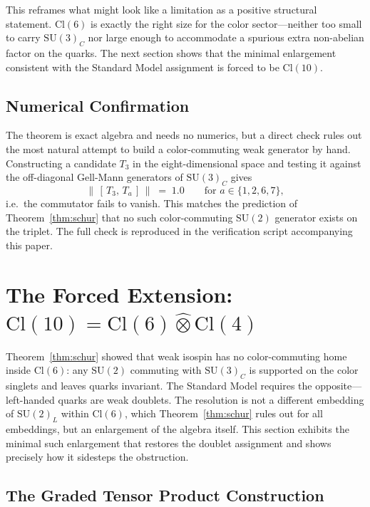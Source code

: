 \documentclass[12pt]{article}
\theoremstyle{remark}
\newcommand{\cl}{\mathrm{Cl}}
\newcommand{\su}{\mathrm{SU}}
\newcommand{\grtensor}{\mathbin{\widehat{\otimes}}}  %
\begin{document}
This reframes what might look like a limitation as a positive structural
statement.  $\cl(6)$ is exactly the right size for the color sector---neither
too small to carry $\su(3)_C$ nor large enough to accommodate a spurious extra
non-abelian factor on the quarks.  The next section shows that the minimal
enlargement consistent with the Standard Model assignment is forced to be
$\cl(10)$.

\subsection{Numerical Confirmation}
\label{sec:schur-numeric}

The theorem is exact algebra and needs no numerics, but a direct check rules out
the most natural attempt to build a color-commuting weak generator by hand.
Constructing a candidate $T_3$ in the eight-dimensional space and testing it
against the off-diagonal Gell-Mann generators of $\su(3)_C$ gives
\begin{equation}
	\bigl\|\,[\,T_3,\,T_a\,]\,\bigr\| \;=\; 1.0
	\qquad \text{for } a\in\{1,2,6,7\},
	\label{eq:commnumeric}
\end{equation}
i.e.\ the commutator fails to vanish.  This matches the prediction of
Theorem~\ref{thm:schur} that no such color-commuting $\su(2)$ generator exists
on the triplet.  The full check is reproduced in the verification script
accompanying this paper.

\section{The Forced Extension:
	\texorpdfstring{$\cl(10)=\cl(6)\grtensor\cl(4)$}{Cl(10)=Cl(6)(x)Cl(4)}}
\label{sec:cl10}

Theorem~\ref{thm:schur} showed that weak isospin has no color-commuting home
inside $\cl(6)$: any $\su(2)$ commuting with $\su(3)_C$ is supported on the color
singlets and leaves quarks invariant.  The Standard Model requires the
opposite---left-handed quarks are weak doublets.  The resolution is not a
different embedding of $\su(2)_L$ within $\cl(6)$, which Theorem~\ref{thm:schur}
rules out for all embeddings, but an enlargement of the algebra itself.  This
section exhibits the minimal such enlargement that restores the doublet
assignment and shows precisely how it sidesteps the obstruction.

\subsection{The Graded Tensor Product Construction}
\label{sec:graded-tensor}
\end{document}
